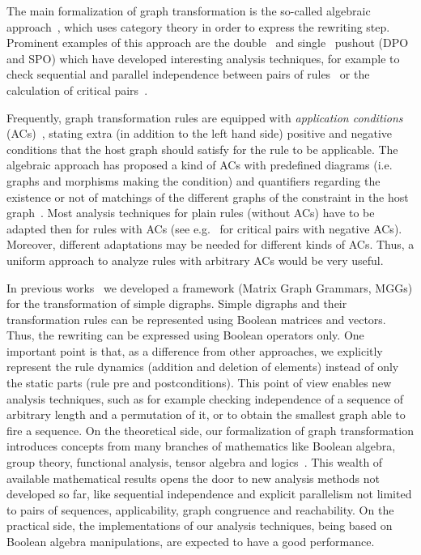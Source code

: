 \documentclass{fundam}
\begin{document}
The main formalization of graph transformation is the so-called
algebraic approach~\cite{graGraBook}, which uses category theory in
order to express the rewriting step. Prominent examples of this approach
are the double~\cite{DPO:handbook,graGraBook} and
single~\cite{SPO:handbook} pushout (DPO and SPO) which have developed
interesting analysis techniques, for example to check sequential and
parallel independence between pairs of
rules~\cite{graGraBook,handbook} or the calculation of critical
pairs~\cite{Heckel,Lambers}.

Frequently, graph transformation rules are equipped with {\em
  application conditions} (ACs)~\cite{AC:Ehrig,graGraBook,HeckelW95},
stating extra (in addition to the left hand side) positive and
negative conditions that the host graph should satisfy for the rule to
be applicable.  The algebraic approach has proposed a kind of ACs with
predefined diagrams (i.e. graphs and morphisms making the condition)
and quantifiers regarding the existence or not of matchings of the
different graphs of the constraint in the host
graph~\cite{AC:Ehrig,graGraBook}. Most analysis techniques for plain
rules (without ACs) have to be adapted then for rules with ACs (see
e.g.~\cite{Lambers} for critical pairs with negative ACs). Moreover,
different adaptations may be needed for different kinds of ACs. Thus,
a uniform approach to analyze rules with arbitrary ACs would be very
useful.

In previous works~\cite{JuanPP_1,JuanPP_2,JuanPP_4,MGGBook} we
developed a framework (Matrix Graph Grammars, MGGs) for the
transformation of simple digraphs. Simple digraphs and their
transformation rules can be represented using Boolean matrices and
vectors. Thus, the rewriting can be expressed using Boolean operators
only. One important point is that, as a difference from other
approaches, we explicitly represent the rule dynamics (addition and
deletion of elements) instead of only the static parts (rule pre and
postconditions). This point of view enables new analysis techniques,
such as for example checking independence of a sequence of arbitrary
length and a permutation of it, or to obtain the smallest graph able
to fire a sequence. On the theoretical side, our formalization of
graph transformation introduces concepts from many branches of
mathematics like Boolean algebra, group theory, functional analysis,
tensor algebra and logics~\cite{MGGBook, MGGCombinatorics, MGGmodel}.
This wealth of available mathematical results opens the door to new
analysis methods not developed so far, like sequential independence
and explicit parallelism not limited to pairs of sequences,
applicability, graph congruence and reachability. On the practical
side, the implementations of our analysis techniques, being based on
Boolean algebra manipulations, are expected to have a good
performance.
\end{document}
